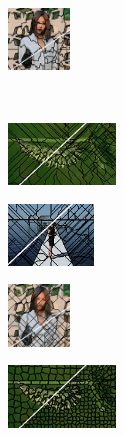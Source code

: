 \begin{figure}
\begin{subfigure}[b]{0.10\textwidth}
		\includegraphics[height=1.65cm]{pictures/fash/qs/cropped/qs_010_contours}
	\end{subfigure}\\
	\begin{subfigure}[b]{0.02\textwidth}
	\end{subfigure}
	\begin{subfigure}[b]{0.16\textwidth}
		\includegraphics[height=1.65cm]{pictures/bsds500/pf/cropped/pf_35028_contours}
	\end{subfigure}
	\begin{subfigure}[b]{0.129\textwidth}
		\includegraphics[height=1.65cm]{pictures/sbd/pf/cropped/pf_0004774_contours}
	\end{subfigure}
	\begin{subfigure}[b]{0.10\textwidth}
		\includegraphics[height=1.65cm]{pictures/fash/pf/cropped/pf_010_contours}
	\end{subfigure}
	\begin{subfigure}[b]{0.02\textwidth}
	\end{subfigure}
	\begin{subfigure}[b]{0.16\textwidth}
		\includegraphics[height=1.65cm]{pictures/bsds500/tp/cropped/tp_35028_contours}
	\end{subfigure}

\end{figure}
